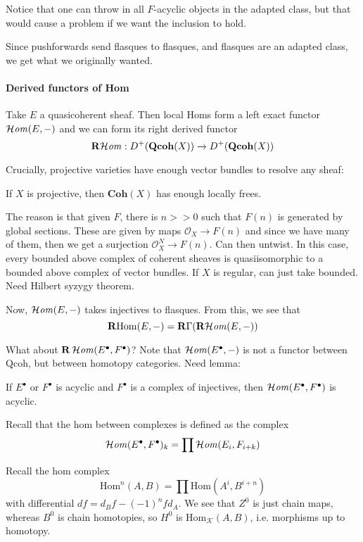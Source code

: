 Notice that one can throw in all $F$-acyclic objects in the adapted class, but that would cause a problem if we want the inclusion to hold.

Since pushforwards send flasques to flasques, and flasques are an adapted class, we get what we originally wanted.

\paragraph{Derived functors of Hom}

Take $E$ a quasicoherent sheaf. Then local Homs form a left exact functor $\operatorname{\mathcal{H}\mathit{om}}(E,-)$ and we can form its right derived functor $$\operatorname{\mathbf{R}\mathcal{H}\mathit{om}}:D^+(\mathbf{Qcoh}(X))\xrightarrow{}D^+(\mathbf{Qcoh}(X))$$

Crucially, projective varieties have enough vector bundles to resolve any sheaf:

\begin{proposition}{}{}
    If $X$ is projective, then $\mathbf{Coh}(X)$ has enough locally frees.  
\end{proposition}

The reason is that given $F$, there is $n>>0$ such that $F(n)$ is generated by global sections. These are given by maps $\mathcal{O}_{X}\xrightarrow{}F(n)$ and since we have many of them, then we get a surjection $\mathcal{O}_{X}^N\xrightarrow{}F(n)$. Can then untwist. In this case, every bounded above complex of coherent sheaves is quasiisomorphic to a bounded above complex of vector bundles. If $X$ is regular, can just take bounded. Need Hilbert syzygy theorem.

Now, $\operatorname{\mathcal{H}\mathit{om}}(E,-)$ takes injectives to flasques. From this, we see that $$\operatorname{\mathbf{R}Hom}(E,-)=\operatorname{\mathbf{R}\Gamma}(\operatorname{\mathbf{R}\mathcal{H}\mathit{om}}(E,-))$$

What about $\mathbf{R}\operatorname{\mathcal{H}\mathit{om}}(E^\bullet, F^\bullet)$? Note that $\operatorname{\mathcal{H}\mathit{om}}(E^\bullet,-)$ is not a functor between $\mathrm{Qcoh}$, but between homotopy categories. Need lemma:

\begin{lemma}{}{}
    If $E^\bullet$ or $F^\bullet$ is acyclic and $F^\bullet$ is a complex of injectives, then $\operatorname{\mathcal{H}\mathit{om}}(E^\bullet, F^\bullet)$ is acyclic.
\end{lemma}

Recall that the hom between complexes is defined as the complex $$\operatorname{\mathcal{H}\mathit{om}}(E^\bullet, F^\bullet)_{k}=\prod \operatorname{\mathcal{H}\mathit{om}}(E_{i}, F_{i+k})$$

Recall the hom complex $$\mathrm{Hom}^n(A,B)=\prod \mathrm{Hom} (A^i, B^{i+n})$$with differential $df=d_{B}f-(-1)^nfd_{A}$. We see that $Z^0$ is just chain maps, whereas $B^0$ is chain homotopies, so $H^0$ is $\mathrm{Hom}_{\mathcal{K}}(A,B)$, i.e. morphisms up to homotopy. 

